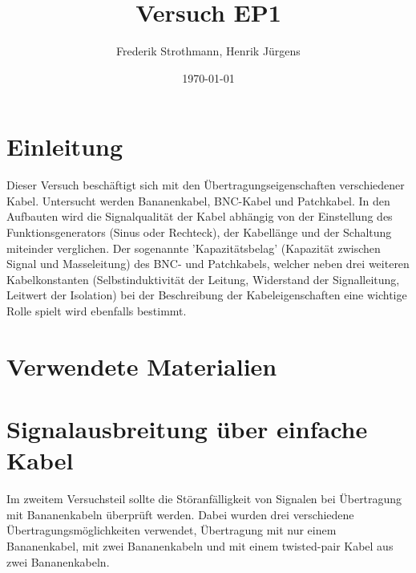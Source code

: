 \documentclass[12pt,a4paper]{article}
\title{Versuch EP1}
\author{Frederik Strothmann, Henrik Jürgens}
\date{\today}
\begin{document}
\maketitle
\newpage
\tableofcontents
\newpage




\newpage\section{Einleitung}
Dieser Versuch beschäftigt sich mit den Übertragungseigenschaften verschiedener Kabel. Untersucht werden Bananenkabel, BNC-Kabel und Patchkabel.\newline
In den Aufbauten wird die Signalqualität der Kabel abhängig von der Einstellung des Funktionsgenerators (Sinus oder Rechteck), der Kabellänge und der Schaltung miteinder verglichen.\newline
Der sogenannte 'Kapazitätsbelag' (Kapazität zwischen Signal und Masseleitung) des BNC- und Patchkabels, welcher neben drei weiteren Kabelkonstanten (Selbstinduktivität der Leitung, Widerstand der Signalleitung, Leitwert der Isolation) bei der Beschreibung der Kabeleigenschaften eine wichtige Rolle spielt wird ebenfalls bestimmt.

\section{Verwendete Materialien}


\section{Signalausbreitung über einfache Kabel}
Im zweitem Versuchsteil sollte die Störanfälligkeit von Signalen bei Übertragung mit Bananenkabeln überprüft werden. Dabei wurden drei verschiedene Übertragungsmöglichkeiten verwendet, Übertragung mit nur einem Bananenkabel, mit zwei Bananenkabeln und mit einem twisted-pair Kabel aus zwei Bananenkabeln.
\end{document}
